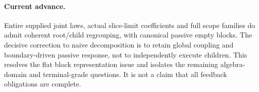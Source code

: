 \documentclass[11pt]{article}
\begin{document}
\paragraph{Current advance.} Entire supplied joint laws, actual slice-limit coefficients and full scope families do admit coherent root/child regrouping, with canonical passive empty blocks. The decisive correction to naive decomposition is to retain global coupling and boundary-driven passive response, not to independently execute children. This resolves the flat block representation issue and isolates the remaining algebra-domain and terminal-grade questions. It is not a claim that all feedback obligations are complete.
\end{document}
